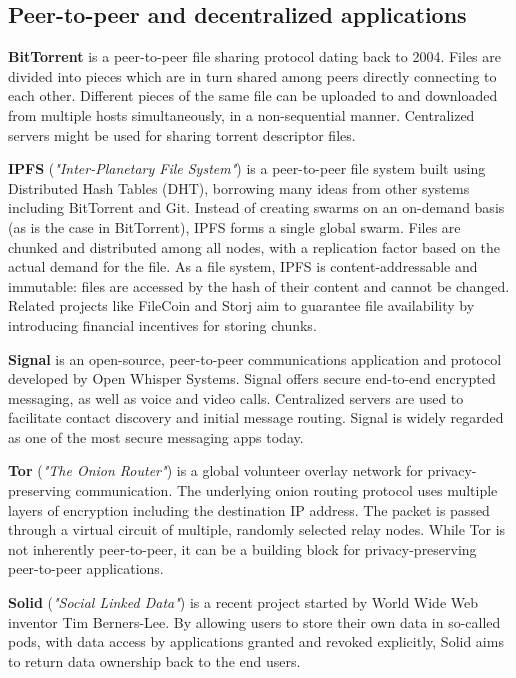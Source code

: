 \documentclass[12pt]{article}
\begin{document}
\subsection{Peer-to-peer and decentralized applications}

\textbf{BitTorrent}\cite{BitTorrent} is a peer-to-peer file sharing protocol dating back to 2004. Files are divided into pieces which are in turn shared among peers directly connecting to each other. Different pieces of the same file can be uploaded to and downloaded from multiple hosts simultaneously, in a non-sequential manner. Centralized servers might be used for sharing torrent descriptor files.

\textbf{IPFS} (\emph{"Inter-Planetary File System"})\cite{IPFS} is a peer-to-peer file system built using Distributed Hash Tables (DHT), borrowing many ideas from other systems including BitTorrent and Git. Instead of creating swarms on an on-demand basis (as is the case in BitTorrent), IPFS forms a single global swarm. Files are chunked and distributed among all nodes, with a replication factor based on the actual demand for the file. As a file system, IPFS is content-addressable and immutable: files are accessed by the hash of their content and cannot be changed. Related projects like FileCoin and Storj aim to guarantee file availability by introducing financial incentives for storing chunks.

\textbf{Signal} is an open-source, peer-to-peer communications application and protocol developed by Open Whisper Systems. Signal offers secure end-to-end encrypted messaging, as well as voice and video calls. Centralized servers are used to facilitate contact discovery and initial message routing. Signal is widely regarded as one of the most secure messaging apps today. \cite{SignalSecurity}

\textbf{Tor} (\emph{"The Onion Router"}) \cite{TOR} is a global volunteer overlay network for privacy-preserving communication. The underlying onion routing protocol uses multiple layers of encryption including the destination IP address. The packet is passed through a virtual circuit of multiple, randomly selected relay nodes. While Tor is not inherently peer-to-peer, it can be a building block for privacy-preserving peer-to-peer applications.

\textbf{Solid} (\emph{"Social Linked Data"}) is a recent project started by World Wide Web inventor Tim Berners-Lee. By allowing users to store their own data in so-called pods, with data access by applications granted and revoked explicitly, Solid aims to return data ownership back to the end users.
\end{document}

